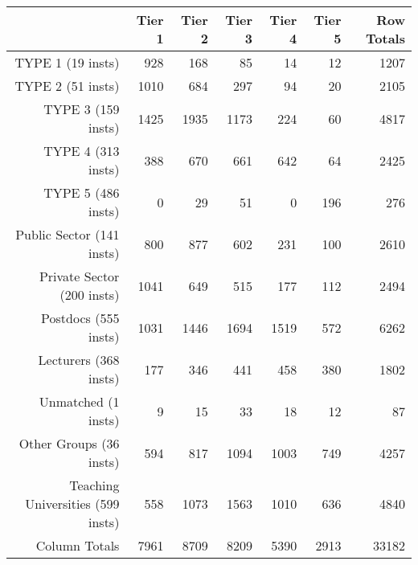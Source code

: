 \begin{tabular}{rrrrrrr}
  \hline
   & \textbf{Tier 1} & \textbf{Tier 2} & \textbf{Tier 3} & \textbf{Tier 4} & \textbf{Tier 5} & \textbf{Row Totals} \\\hline
  TYPE 1 (19 insts) & 928 & 168 & 85 & 14 & 12 & 1207 \\
  TYPE 2 (51 insts) & 1010 & 684 & 297 & 94 & 20 & 2105 \\
  TYPE 3 (159 insts) & 1425 & 1935 & 1173 & 224 & 60 & 4817 \\
  TYPE 4 (313 insts) & 388 & 670 & 661 & 642 & 64 & 2425 \\
  TYPE 5 (486 insts) & 0 & 29 & 51 & 0 & 196 & 276 \\
  Public Sector (141 insts) & 800 & 877 & 602 & 231 & 100 & 2610 \\
  Private Sector (200 insts) & 1041 & 649 & 515 & 177 & 112 & 2494 \\
  Postdocs (555 insts) & 1031 & 1446 & 1694 & 1519 & 572 & 6262 \\
  Lecturers (368 insts) & 177 & 346 & 441 & 458 & 380 & 1802 \\
  Unmatched (1 insts) & 9 & 15 & 33 & 18 & 12 & 87 \\
  Other Groups (36 insts) & 594 & 817 & 1094 & 1003 & 749 & 4257 \\
  Teaching Universities (599 insts) & 558 & 1073 & 1563 & 1010 & 636 & 4840 \\
  Column Totals & 7961 & 8709 & 8209 & 5390 & 2913 & 33182 \\\hline
\end{tabular}
